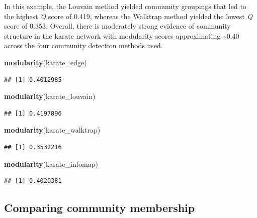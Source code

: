 \documentclass[
]{book}
\newenvironment{Shaded}{\begin{snugshade}}{\end{snugshade}}
\newcommand{\FunctionTok}[1]{\textcolor[rgb]{0.13,0.29,0.53}{\textbf{#1}}}
\newcommand{\NormalTok}[1]{#1}
\begin{document}
In this example, the Louvain method yielded community groupings that led to the highest \emph{Q} score of 0.419, whereas the Walktrap method yielded the lowest \emph{Q} score of 0.353. Overall, there is moderately strong evidence of community structure in the karate network with modularity scores approximating \textasciitilde0.40 across the four community detection methods used.

\begin{Shaded}
\begin{Highlighting}[]
\FunctionTok{modularity}\NormalTok{(karate\_edge)}
\end{Highlighting}
\end{Shaded}

\begin{verbatim}
## [1] 0.4012985
\end{verbatim}

\begin{Shaded}
\begin{Highlighting}[]
\FunctionTok{modularity}\NormalTok{(karate\_louvain)}
\end{Highlighting}
\end{Shaded}

\begin{verbatim}
## [1] 0.4197896
\end{verbatim}

\begin{Shaded}
\begin{Highlighting}[]
\FunctionTok{modularity}\NormalTok{(karate\_walktrap)}
\end{Highlighting}
\end{Shaded}

\begin{verbatim}
## [1] 0.3532216
\end{verbatim}

\begin{Shaded}
\begin{Highlighting}[]
\FunctionTok{modularity}\NormalTok{(karate\_infomap)}
\end{Highlighting}
\end{Shaded}

\begin{verbatim}
## [1] 0.4020381
\end{verbatim}

\subsection{Comparing community membership}\label{comparing-community-membership}
\end{document}
